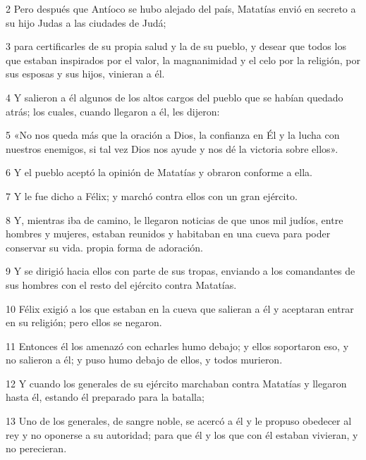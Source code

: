 \par 2 Pero después que Antíoco se hubo alejado del país, Matatías envió en secreto a su hijo Judas a las ciudades de Judá;

\par 3 para certificarles de su propia salud y la de su pueblo, y desear que todos los que estaban inspirados por el valor, la magnanimidad y el celo por la religión, por sus esposas y sus hijos, vinieran a él.

\par 4 Y salieron a él algunos de los altos cargos del pueblo que se habían quedado atrás; los cuales, cuando llegaron a él, les dijeron:

\par 5 «No nos queda más que la oración a Dios, la confianza en Él y la lucha con nuestros enemigos, si tal vez Dios nos ayude y nos dé la victoria sobre ellos».

\par 6 Y el pueblo aceptó la opinión de Matatías y obraron conforme a ella.

\par 7 Y le fue dicho a Félix; y marchó contra ellos con un gran ejército.

\par 8 Y, mientras iba de camino, le llegaron noticias de que unos mil judíos, entre hombres y mujeres, estaban reunidos y habitaban en una cueva para poder conservar su vida. propia forma de adoración.

\par 9 Y se dirigió hacia ellos con parte de sus tropas, enviando a los comandantes de sus hombres con el resto del ejército contra Matatías.

\par 10 Félix exigió a los que estaban en la cueva que salieran a él y aceptaran entrar en su religión; pero ellos se negaron.

\par 11 Entonces él los amenazó con echarles humo debajo; y ellos soportaron eso, y no salieron a él; y puso humo debajo de ellos, y todos murieron.

\par 12 Y cuando los generales de su ejército marchaban contra Matatías y llegaron hasta él, estando él preparado para la batalla;

\par 13 Uno de los generales, de sangre noble, se acercó a él y le propuso obedecer al rey y no oponerse a su autoridad; para que él y los que con él estaban vivieran, y no perecieran.


